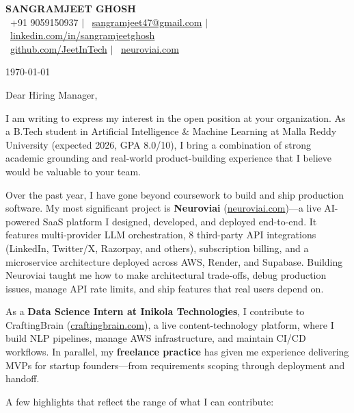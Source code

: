 \documentclass[11pt]{article}
\begin{document}
\begin{center}
{\Large \textbf{SANGRAMJEET GHOSH}} \\[6pt]
{\small
\faPhone\ +91 9059150937 \quad $|$ \quad
\faEnvelope\ \href{mailto:sangramjeet47@gmail.com}{sangramjeet47@gmail.com} \quad $|$ \quad
\faLinkedin\ \href{https://www.linkedin.com/in/sangramjeetghosh}{linkedin.com/in/sangramjeetghosh}
}\\[2pt]
{\small
\faGithub\ \href{https://github.com/JeetInTech}{github.com/JeetInTech} \quad $|$ \quad
\faGlobe\ \href{https://neuroviai.com}{neuroviai.com}
}
\end{center}

\vspace{10pt}

\noindent \today

\vspace{6pt}

\noindent Dear Hiring Manager,

I am writing to express my interest in the open position at your organization. As a B.Tech student in Artificial Intelligence \& Machine Learning at Malla Reddy University (expected 2026, GPA 8.0/10), I bring a combination of strong academic grounding and real-world product-building experience that I believe would be valuable to your team.

Over the past year, I have gone beyond coursework to build and ship production software. My most significant project is \textbf{Neuroviai} (\href{https://neuroviai.com}{neuroviai.com})---a live AI-powered SaaS platform I designed, developed, and deployed end-to-end. It features multi-provider LLM orchestration, 8 third-party API integrations (LinkedIn, Twitter/X, Razorpay, and others), subscription billing, and a microservice architecture deployed across AWS, Render, and Supabase. Building Neuroviai taught me how to make architectural trade-offs, debug production issues, manage API rate limits, and ship features that real users depend on.

As a \textbf{Data Science Intern at Inikola Technologies}, I contribute to CraftingBrain (\href{https://craftingbrain.com}{craftingbrain.com}), a live content-technology platform, where I build NLP pipelines, manage AWS infrastructure, and maintain CI/CD workflows. In parallel, my \textbf{freelance practice} has given me experience delivering MVPs for startup founders---from requirements scoping through deployment and handoff.

A few highlights that reflect the range of what I can contribute:
\end{document}
